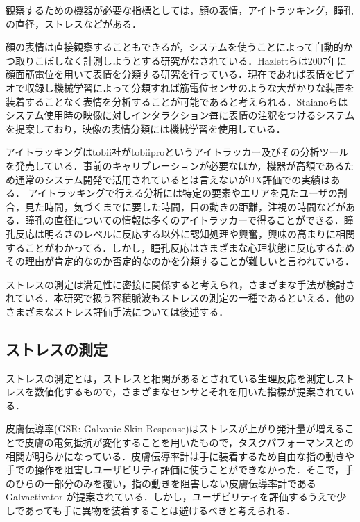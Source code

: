 観察するための機器が必要な指標としては，顔の表情，アイトラッキング，瞳孔の直径，ストレス\cite{tullis2014}などがある．

顔の表情は直接観察することもできるが，システムを使うことによって自動的かつ取りこぼしなく計測しようとする研究がなされている．Hazlettらは2007年に顔面筋電位を用いて表情を分類する研究を行っている\cite{faceemg}．現在であれば表情をビデオで収録し機械学習によって分類すれば筋電位センサのような大がかりな装置を装着することなく表情を分析することが可能であると考えられる．Staianoらはシステム使用時の映像に対しインタラクション毎に表情の注釈をつけるシステムを提案しており，映像の表情分類には機械学習を使用している\cite{uxmate}．

アイトラッキングはtobii社がtobiipro\cite{tobii}というアイトラッカー及びその分析ツールを発売している．事前のキャリブレーションが必要なほか，機器が高額であるため通常のシステム開発で活用されているとは言えないがUX評価での実績はある．
アイトラッキングで行える分析には特定の要素やエリアを見たユーザの割合，見た時間，気づくまでに要した時間，目の動きの距離，注視の時間などがある\cite{tullis2014}．瞳孔の直径についての情報は多くのアイトラッカーで得ることができる．瞳孔反応は明るさのレベルに反応する以外に認知処理や興奮，興味の高まりに相関することがわかってる．しかし，瞳孔反応はさまざまな心理状態に反応するためその理由が肯定的なのか否定的なのかを分類することが難しいと言われている\cite{tullis2014}．

ストレスの測定は満足性に密接に関係すると考えられ，さまざまな手法が検討されている．本研究で扱う容積脈波もストレスの測定の一種であるといえる．他のさまざまなストレス評価手法については後述する．

\subsection{ストレスの測定}

ストレスの測定とは，ストレスと相関があるとされている生理反応を測定しストレスを数値化するもので，さまざまなセンサとそれを用いた指標が提案されている．

皮膚伝導率(GSR: Galvanic Skin Response)はストレスが上がり発汗量が増えることで皮膚の電気抵抗が変化することを用いたもので，タスクパフォーマンスとの相関が明らかになっている\cite{lin2005}．皮膚伝導率計は手に装着するため自由な指の動きや手での操作を阻害しユーザビリティ評価に使うことができなかった．そこで，手のひらの一部分のみを覆い，指の動きを阻害しない皮膚伝導率計であるGalvactivator\cite{galvactivator} が提案されている．しかし，ユーザビリティを評価するうえで少しであっても手に異物を装着することは避けるべきと考えられる．

